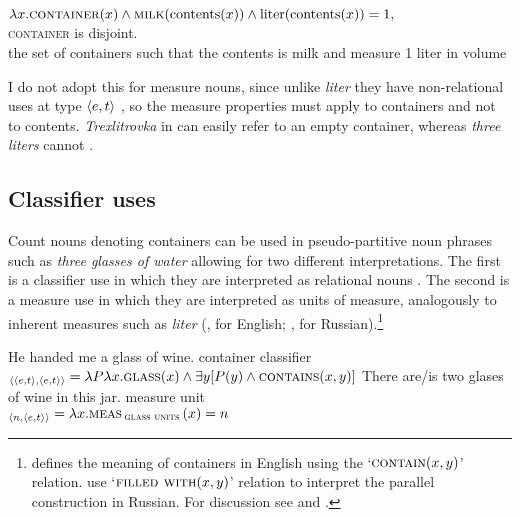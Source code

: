 \documentclass[output=paper,
colorlinks,
citecolor=brown,
newtxmath
]{langscibook}
\begin{document}
\ea\label{ex:25} $\lambda x. \textsc{container}(x) \wedge \textsc{milk}(\textnormal{contents}(x)) \wedge \textnormal{liter}(\textnormal{contents}(x)) = 1,$\\
{\small \textsc{container} is disjoint.\\
the set of containers such that the contents is milk and measure 1 liter in volume}
\z

\noindent I do not adopt this for measure nouns, since unlike \textit{liter} they have non-relational uses at type $\langle{e,t}\rangle$ , so the measure properties must apply to containers and not to contents. \textit{Trexlitrovka} in  can easily refer to an empty container, whereas \textit{three liters} cannot .

\ea\label{ex:26}
\z\z

\subsection{Classifier uses}
Count nouns denoting containers can be used in pseudo-partitive noun phrases such as \textit{three glasses of water} allowing for two different interpretations. The first is a classifier use in which they are interpreted as relational nouns . The second is a measure use in which they are interpreted as units of measure, analogously to inherent measures such as \textit{liter}  (\citealt{Rothstein2009,Rothstein2017}, \citealt{Landman2004,Landman2016} for English; \citealt{Partee.Borschev2012}, \citealt{Khrizman2016a,Khrizman2016b} for Russian).\footnote{\citet{Rothstein2009,Rothstein2017} defines the meaning of containers in English using the `$\textsc{contain}(x,y)$' relation. \citet{Partee.Borschev2012} use `$\textsc{filled with}(x,y)$' relation to interpret the parallel construction in Russian. For discussion see \citet{Partee.Borschev2012} and \citet{Rothstein2017}.}

\ea\label{ex:27}
    \ea\label{ex:27a} He handed me a glass of wine. \hfill container classifier\\
    $_{\langle{\ensuremath{\langle{e,t}\rangle},\ensuremath{\langle{e,t}\rangle}}\rangle} = \lambda P \lambda x.\textsc{glass}(x) \wedge \exists y[P(y) \wedge \textsc{contains}(x,y)]$
    \ex\label{ex:27b} There are/is two glases of wine in this jar. \hfill measure unit\\
    $_{\langle{n,\ensuremath{\langle{e,t}\rangle}}\rangle} = \lambda x. \textsc{meas}\,_{\textsc{glass units}}\,(x) = n$
\z\z
\end{document}
